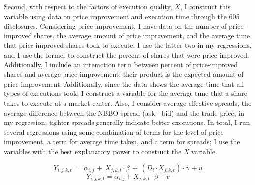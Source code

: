 \documentclass[12pt,a4paper]{article}
\begin{document}
	Second, with respect to the factors of execution quality, $X$, I construct this variable using data on price improvement and execution time through the 605 disclosures. Considering price improvement, I have data on the number of price-improved shares, the average amount of price improvement, and the average time that price-improved shares took to execute. I use the latter two in my regressions, and I use the former to construct the percent of shares that were price-improved. Additionally, I include an interaction term between percent of price-improved shares and average price improvement; their product is the expected amount of price improvement. Additionally, since the data shows the average time that all types of executions took, I construct a variable for the average time that a share takes to execute at a market center. Also, I consider average effective spreads, the average difference between the NBBO spread (ask - bid) and the trade price, in my regression; tighter spreads generally indicate better executions. In total, I run several regressions using some combination of terms for the level of price improvement, a term for average time taken, and a term for spreads; I use the variables with the best explanatory power to construct the $X$ variable. 
	
	\begin{equation}
	Y_{i, j, k,  t} \,=\, \alpha_{i,j} \,+\,  X_{j, k, t} \cdot \beta \,+\,  (D_i \cdot X_{j, k, t}) \cdot \gamma\, +  u
	\end{equation}	
	\begin{equation}
	Y_{i, j, k, t} = \alpha_{i,j} +  X_{j, k, t} \cdot \beta +  v
	\end{equation}	
\end{document}
